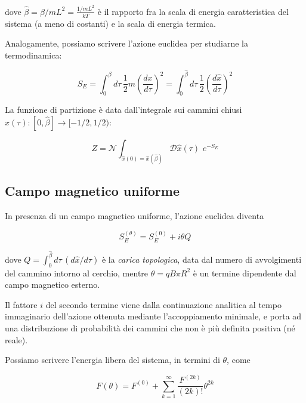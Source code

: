 \documentclass[a4paper,11pt]{article}
\begin{document}
    dove $\hat{\beta} = \beta / mL^2 = \frac{1/mL^2}{kT}$ è il rapporto fra la scala di energia caratteristica del sistema (a meno di costanti) e la scala di energia termica.

    
    Analogamente, possiamo scrivere l'azione euclidea per studiarne la termodinamica:
    
    \begin{equation}
        S_E = \int_0^\beta d\tau \, \frac{1}{2} m \left(\frac{dx}{d\tau}\right)^2 = \int_0^{\hat{\beta}} d\tau \, \frac{1}{2} \left( \frac{d\hat{x}}{d\tau}\right)^2
    \end{equation}
    
    
    
    La funzione di partizione è data dall'integrale sui cammini chiusi $\hat{x}(\tau): [0, \hat{\beta}] \to [-1/2, 1/2)$:
    
    \begin{equation}
        Z = \mathcal{N} \int_{\hat{x}(0) = \hat{x}(\hat{\beta})} \mathcal{D}\hat{x}(\tau) \, \,e^{-S_E}
    \end{equation}

    \subsection{Campo magnetico uniforme}
    In presenza di un campo magnetico uniforme, l'azione euclidea diventa
    
    \begin{equation}
        S^{(\theta)}_E = S^{(0)}_E + i\theta Q
    \end{equation}
    
    dove $Q = \int_0^{\hat{\beta}} d\tau \, ({d\hat{x}} / {d\tau})$ è la \emph{carica topologica}, data dal numero di avvolgimenti del cammino intorno al cerchio, mentre $\theta = qB\pi R^2$ è un termine dipendente dal campo magnetico esterno. 
    
    Il fattore $i$ del secondo termine viene dalla continuazione analitica al tempo immaginario dell'azione ottenuta mediante l'accoppiamento minimale, e porta ad una distribuzione di probabilità dei cammini che non è più definita positiva (né reale). 
    
    Possiamo scrivere l'energia libera del sistema, in termini di $\theta$, come
    
    \begin{equation}
        F(\theta) = F^{(0)} + \sum_{k=1}^{\infty} \frac{F^{(2k)}}{(2k)!} \theta^{2k}
    \end{equation}
    
\end{document}
